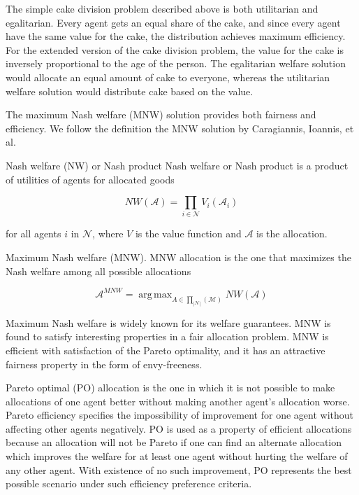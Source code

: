 The simple cake division problem described above is both utilitarian and egalitarian. Every agent gets an equal share of the cake, and since every agent have the same value for the cake, the distribution achieves maximum efficiency. For the extended version of the cake division problem, the value for the cake is inversely proportional to the age of the person. The egalitarian welfare solution would allocate an equal amount of cake to everyone, whereas the utilitarian welfare solution would distribute cake based on the value.

The maximum Nash welfare (MNW) solution provides both fairness and efficiency. We follow the definition the MNW solution by Caragiannis, Ioannis, et al. \cite{caragiannis2016unreasonable}

\begin{definition}{Nash welfare (NW) or Nash product}
Nash welfare or Nash product is a product of utilities of agents for allocated goods

$$
    NW(\mathcal{A}) = \prod_{i \in \mathcal{N}} V_i(\mathcal{A}_i)
$$

for all agents $i$ in $\mathcal{N}$, where $V$ is the value function and $\mathcal{A}$ is the allocation.
\end{definition}

\begin{definition}{Maximum Nash welfare (MNW).}
MNW allocation is the one that maximizes the Nash welfare among all possible allocations

$$
    \mathcal{A}^{MNW} = \operatorname{arg\,max}_{A \in \prod_{|\mathcal{N}|}(\mathcal{M})} NW(\mathcal{A})
$$
\end{definition}


Maximum Nash welfare is widely known for its welfare guarantees. MNW is found to satisfy interesting properties in a fair allocation problem. MNW is efficient with satisfaction of the Pareto optimality, and it has an attractive fairness property in the form of envy-freeness.

Pareto optimal (PO) allocation is the one in which it is not possible to make allocations of one agent better without making another agent's allocation worse. Pareto efficiency specifies the impossibility of improvement for one agent without affecting other agents negatively. PO is used as a property of efficient allocations because an allocation will not be Pareto if one can find an alternate allocation which improves the welfare for at least one agent without hurting the welfare of any other agent. With existence of no such improvement, PO represents the best possible scenario under such efficiency preference criteria.

